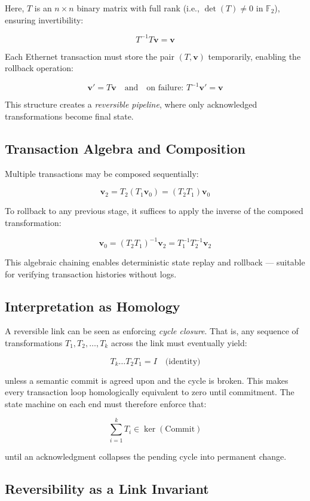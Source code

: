\documentclass[../../../OAE-SPEC-MAIN.tex]{subfiles}
\begin{document}
Here, $T$ is an $n \times n$ binary matrix with full rank (i.e., $\det(T) \ne 0$ in $\mathbb{F}_2$), ensuring invertibility:

\[
T^{-1}T\mathbf{v} = \mathbf{v}
\]

Each Ethernet transaction must store the pair $(T, \mathbf{v})$ temporarily, enabling the rollback operation:

\[
\mathbf{v}' = T\mathbf{v} \quad \text{and} \quad \text{on failure: } T^{-1}\mathbf{v}' = \mathbf{v}
\]

This structure creates a \emph{reversible pipeline}, where only acknowledged transformations become final state.

\subsection*{Transaction Algebra and Composition}

Multiple transactions may be composed sequentially:

\[
\mathbf{v}_2 = T_2(T_1\mathbf{v}_0) = (T_2T_1)\mathbf{v}_0
\]

To rollback to any previous stage, it suffices to apply the inverse of the composed transformation:

\[
\mathbf{v}_0 = (T_2T_1)^{-1}\mathbf{v}_2 = T_1^{-1}T_2^{-1}\mathbf{v}_2
\]

This algebraic chaining enables deterministic state replay and rollback — suitable for verifying transaction histories without logs.

\subsection*{Interpretation as Homology}

A reversible link can be seen as enforcing \emph{cycle closure}. That is, any sequence of transformations $T_1, T_2, \dots, T_k$ across the link must eventually yield:

\[
T_k \dots T_2 T_1 = I \quad \text{(identity)}
\]

unless a semantic commit is agreed upon and the cycle is broken. This makes every transaction loop homologically equivalent to zero until commitment. The state machine on each end must therefore enforce that:

\[
\sum_{i=1}^k T_i \in \ker(\text{Commit})
\]

until an acknowledgment collapses the pending cycle into permanent change.

\subsection*{Reversibility as a Link Invariant}
\end{document}
